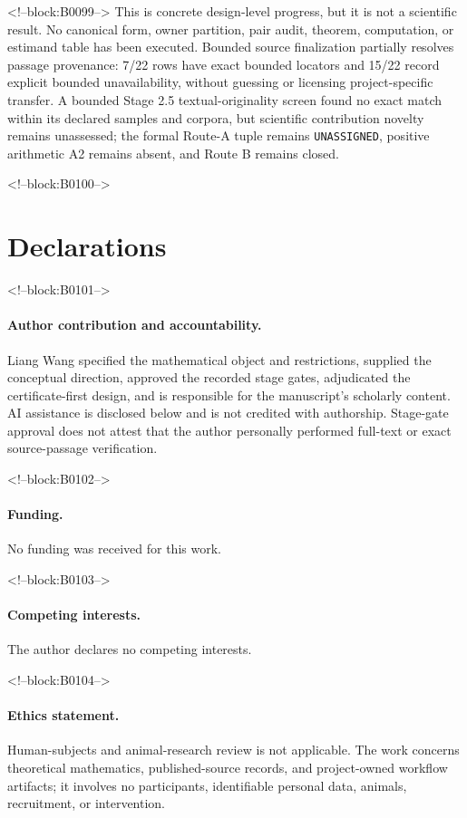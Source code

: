 \documentclass[11pt]{article}
\begin{document}
<!--block:B0099-->
This is concrete design-level progress, but it is not a scientific
result. No canonical form, owner partition, pair audit, theorem,
computation, or estimand table has been executed. Bounded source finalization partially resolves passage provenance: 7/22 rows
have exact bounded locators and 15/22 record explicit bounded unavailability,
without guessing or licensing project-specific transfer. A bounded Stage 2.5 textual-originality
screen found no exact match within its declared samples and corpora, but
scientific contribution novelty remains unassessed; the formal Route-A
tuple remains \texttt{UNASSIGNED}, positive arithmetic A2 remains absent,
and Route B remains closed.

<!--block:B0100-->
\section*{Declarations}

<!--block:B0101-->
\paragraph{Author contribution and accountability.}
Liang Wang specified the mathematical object and restrictions, supplied
the conceptual direction, approved the recorded stage gates,
adjudicated the certificate-first design, and is responsible for the
manuscript's scholarly content. AI assistance is disclosed below and is
not credited with authorship. Stage-gate approval does not attest that
the author personally performed full-text or exact source-passage
verification.

<!--block:B0102-->
\paragraph{Funding.} No funding was received for this work.

<!--block:B0103-->
\paragraph{Competing interests.} The author declares no competing
interests.

<!--block:B0104-->
\paragraph{Ethics statement.} Human-subjects and animal-research review
is not applicable. The work concerns theoretical mathematics,
published-source records, and project-owned workflow artifacts; it
involves no participants, identifiable personal data, animals,
recruitment, or intervention.
\end{document}
